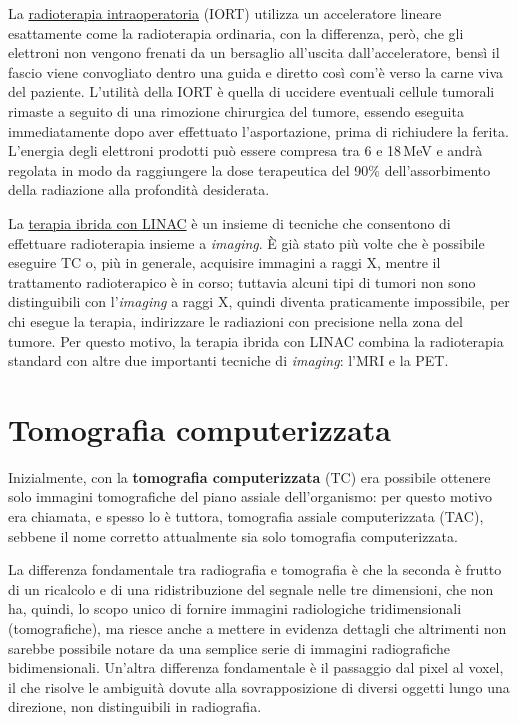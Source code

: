 \documentclass{report}
\numberwithin{equation}{section}
\numberwithin{figure}{section}
\begin{document}
La \underline{radioterapia intraoperatoria} (IORT) utilizza un acceleratore lineare esattamente come la radioterapia ordinaria, con la differenza, però, che gli elettroni non vengono frenati da un bersaglio all'uscita dall'acceleratore, bensì il fascio viene convogliato dentro una guida e diretto così com'è verso la carne viva del paziente. L'utilità della IORT è quella di uccidere eventuali cellule tumorali rimaste a seguito di una rimozione chirurgica del tumore, essendo eseguita immediatamente dopo aver effettuato l'asportazione, prima di richiudere la ferita. L'energia degli elettroni prodotti può essere compresa tra 6 e 18\,MeV e andrà regolata in modo da raggiungere la dose terapeutica del 90\% dell'assorbimento della radiazione alla profondità desiderata.

La \underline{terapia ibrida con LINAC} è un insieme di tecniche che consentono di effettuare radioterapia insieme a \textit{imaging}. È già stato più volte che è possibile eseguire TC o, più in generale, acquisire immagini a raggi X, mentre il trattamento radioterapico è in corso; tuttavia alcuni tipi di tumori non sono distinguibili con l'\textit{imaging} a raggi X, quindi diventa praticamente impossibile, per chi esegue la terapia, indirizzare le radiazioni con precisione nella zona del tumore. Per questo motivo, la terapia ibrida con LINAC combina la radioterapia standard con altre due importanti tecniche di \textit{imaging}: l'MRI e la PET.

\section{Tomografia computerizzata}
Inizialmente, con la \textbf{tomografia computerizzata} (TC) era possibile ottenere solo immagini tomografiche del piano assiale dell'organismo: per questo motivo era chiamata, e spesso lo è tuttora, tomografia assiale computerizzata (TAC), sebbene il nome corretto attualmente sia solo tomografia computerizzata.

La differenza fondamentale tra radiografia e tomografia è che la seconda è frutto di un ricalcolo e di una ridistribuzione del segnale nelle tre dimensioni, che non ha, quindi, lo scopo unico di fornire immagini radiologiche tridimensionali (tomografiche), ma riesce anche a mettere in evidenza dettagli che altrimenti non sarebbe possibile notare da una semplice serie di immagini radiografiche bidimensionali. Un'altra differenza fondamentale è il passaggio dal pixel al voxel, il che risolve le ambiguità dovute alla sovrapposizione di diversi oggetti lungo una direzione, non distinguibili in radiografia.
\end{document}
